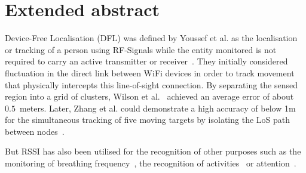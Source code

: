 \documentclass[journal]{IEEEtran}
\begin{document}
%





  \section{Extended abstract}
  Device-Free Localisation (DFL) was defined by Youssef et al. as the localisation or tracking of a person using RF-Signals while the entity monitored is not required to carry an active transmitter or receiver~\cite{Pervasive_Youssef_2007}.
  They initially considered fluctuation in the direct link between WiFi devices in order to track movement that physically intercepts this line-of-sight connection.
  By separating the sensed region into a grid of clusters, Wilson et al.~\cite{RFSensing_Wilson_2009} achieved an average error of about $0.5$~meters.
  Later, Zhang et al. could demonstrate a high accuracy of below 1m for the simultaneous tracking of five moving targets by isolating the LoS path between nodes~\cite{Pervasive_Zhang_2012}.

  But RSSI has also been utilised for the recognition of other purposes such as the monitoring of breathing frequency~\cite{Pervasive_Patwari_2011b}, the recognition of activities~\cite{Pervasive_Scholz_2013} or attention~\cite{Pervasive_Shi_2014}.
\end{document}
